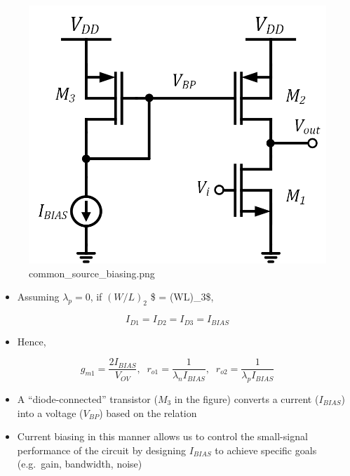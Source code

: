 \documentclass[11pt]{article}
\providecommand{\tightlist}{%
      \setlength{\itemsep}{0pt}\setlength{\parskip}{0pt}}
\begin{document}
    \begin{figure}
\centering
\includegraphics{common_source_biasing.png}
\caption{common\_source\_biasing.png}
\end{figure}

    \begin{itemize}
\tightlist
\item
  Assuming \(\lambda_p = 0\), if \((W/L)_2\) \$ = (WL)\_3\$,
\end{itemize}

\begin{equation}
I_{D1} = I_{D2} = I_{D3} = I_{BIAS}
\end{equation}

\begin{itemize}
\tightlist
\item
  Hence,
\end{itemize}

\begin{equation}
g_{m1} = \dfrac{2I_{BIAS}}{V_{OV}}, \;\; r_{o1} = \dfrac{1}{\lambda_n I_{BIAS}}, \;\; r_{o2} = \dfrac{1}{\lambda_p I_{BIAS}} 
\end{equation}

    \begin{itemize}
\tightlist
\item
  A ``diode-connected'' transistor (\(M_3\) in the figure) converts a
  current (\(I_{BIAS}\)) into a voltage (\(V_{BP}\)) based on the
  relation
\item
  Current biasing in this manner allows us to control the small-signal
  performance of the circuit by designing \(I_{BIAS}\) to achieve
  specific goals (e.g.~gain, bandwidth, noise)
\end{itemize}
\end{document}
